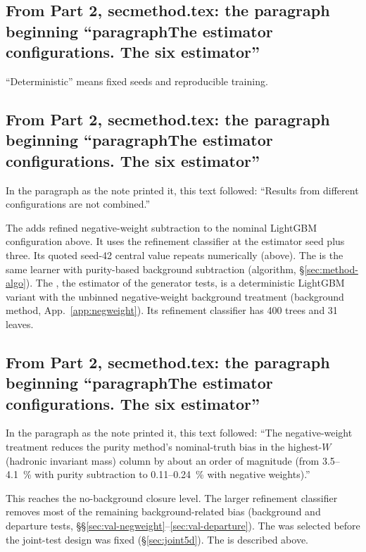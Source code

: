 \subsection{From Part 2, secmethod.tex: the paragraph beginning ``paragraphThe estimator configurations. The six estimator''}
``Deterministic'' means fixed seeds and reproducible training.

\subsection{From Part 2, secmethod.tex: the paragraph beginning ``paragraphThe estimator configurations. The six estimator''}
In the paragraph as the note printed it, this text followed: ``Results from different configurations are not combined.''\par
The \estTwoD{} adds refined negative-weight subtraction to the nominal LightGBM configuration above. It uses the \estMultiD{} refinement classifier at the estimator seed plus three. Its quoted seed-42 central value repeats numerically (above). The \estPurity{} is the same learner with purity-based background subtraction (algorithm, \S\ref{sec:method-algo}). The \estMultiD{}, the estimator of the generator tests, is a deterministic LightGBM variant with the unbinned negative-weight background treatment (background method, App.~\ref{app:negweight}). Its refinement classifier has 400 trees and 31 leaves.

\subsection{From Part 2, secmethod.tex: the paragraph beginning ``paragraphThe estimator configurations. The six estimator''}
In the paragraph as the note printed it, this text followed: ``The negative-weight treatment reduces the purity method's nominal-truth bias in the highest-$W$ (hadronic invariant mass) column by about an order of magnitude (from 3.5--\SI{4.1}{\percent} with purity subtraction to 0.11--\SI{0.24}{\percent} with negative weights).''\par
This reaches the no-background closure level. The larger refinement classifier removes most of the remaining background-related bias (background and departure tests, \S\S\ref{sec:val-negweight}--\ref{sec:val-departure}). The \estMultiD{} was selected before the joint-test design was fixed (\S\ref{sec:joint5d}). The \estExact{} is described above.


